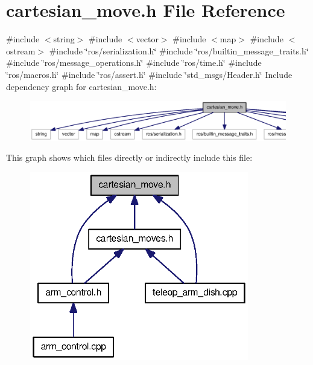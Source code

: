 \section{cartesian\-\_\-move.\-h \-File \-Reference}
\label{cartesian__move_8h}
{\ttfamily \#include $<$string$>$}\*
{\ttfamily \#include $<$vector$>$}\*
{\ttfamily \#include $<$map$>$}\*
{\ttfamily \#include $<$ostream$>$}\*
{\ttfamily \#include \char`\"{}ros/serialization.\-h\char`\"{}}\*
{\ttfamily \#include \char`\"{}ros/builtin\-\_\-message\-\_\-traits.\-h\char`\"{}}\*
{\ttfamily \#include \char`\"{}ros/message\-\_\-operations.\-h\char`\"{}}\*
{\ttfamily \#include \char`\"{}ros/time.\-h\char`\"{}}\*
{\ttfamily \#include \char`\"{}ros/macros.\-h\char`\"{}}\*
{\ttfamily \#include \char`\"{}ros/assert.\-h\char`\"{}}\*
{\ttfamily \#include \char`\"{}std\-\_\-msgs/\-Header.\-h\char`\"{}}\*
\-Include dependency graph for cartesian\-\_\-move.\-h\-:\nopagebreak
\begin{figure}[H]
\begin{center}
\leavevmode
\includegraphics[width=350pt]{cartesian__move_8h__incl}
\end{center}
\end{figure}
\-This graph shows which files directly or indirectly include this file\-:\nopagebreak
\begin{figure}[H]
\begin{center}
\leavevmode
\includegraphics[width=271pt]{cartesian__move_8h__dep__incl}
\end{center}
\end{figure}
